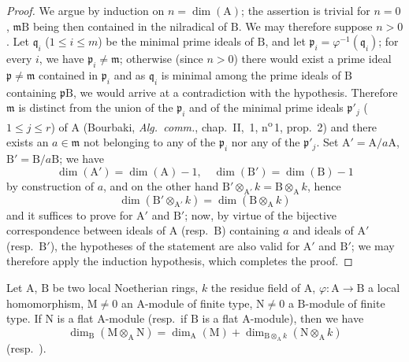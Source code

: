 \begin{proof}
We argue by induction on $n=\dim(\mathrm{A})$; the assertion is trivial for $n=0$, $\mathfrak{m}\mathrm{B}$ being then contained in the nilradical of $\mathrm{B}$.
We may therefore suppose $n>0$.
Let $\mathfrak{q}_i$ ($1\leqslant i\leqslant m$) be the minimal prime ideals of $\mathrm{B}$, and let $\mathfrak{p}_i=\varphi^{-1}(\mathfrak{q}_i)$; for every $i$, we have $\mathfrak{p}_i\neq\mathfrak{m}$; otherwise (since $n>0$) there would exist a prime ideal $\mathfrak{p}\neq\mathfrak{m}$ contained in $\mathfrak{p}_i$ and as $\mathfrak{q}_i$ is minimal among the prime ideals of $\mathrm{B}$ containing $\mathfrak{p}\mathrm{B}$, we would arrive at a contradiction with the hypothesis.
Therefore $\mathfrak{m}$ is distinct from the union of the $\mathfrak{p}_i$ and of the minimal prime ideals $\mathfrak{p}'_j$ ($1\leqslant j\leqslant r$) of $\mathrm{A}$ (Bourbaki, \emph{Alg.\ comm.}, chap.~II, \textsection\,1, n\textsuperscript{o}\,1, prop.~2) and there exists an $a\in\mathfrak{m}$ not belonging to any of the $\mathfrak{p}_i$ nor any of the $\mathfrak{p}'_j$.
Set $\mathrm{A}'=\mathrm{A}/a\mathrm{A}$, $\mathrm{B}'=\mathrm{B}/a\mathrm{B}$; we have 
\[
  \dim(\mathrm{A}')=\dim(\mathrm{A})-1,\quad
  \dim(\mathrm{B}')=\dim(\mathrm{B})-1
\]
by construction of $a$, and on the other hand $\mathrm{B}'\otimes_{\mathrm{A}'}k=\mathrm{B}\otimes_\mathrm{A} k$, hence
\[
  \dim(\mathrm{B}'\otimes_{\mathrm{A}'}k)=\dim(\mathrm{B}\otimes_\mathrm{A} k)
\]
and it suffices to prove  for $\mathrm{A}'$ and $\mathrm{B}'$; now, by virtue of the bijective correspondence between ideals of $\mathrm{A}$ (resp.\ $\mathrm{B}$) containing $a$ and ideals of $\mathrm{A}'$ (resp.\ $\mathrm{B}'$), the hypotheses of the statement are also valid for $\mathrm{A}'$ and $\mathrm{B}'$; we may therefore apply the induction hypothesis, which completes the proof.
\end{proof}

\begin{corollary}[6.1.2]
\label{IV.6.1.2}
Let $\mathrm{A}$, $\mathrm{B}$ be two local Noetherian rings, $k$ the residue field of $\mathrm{A}$, $\varphi:\mathrm{A}\to\mathrm{B}$ a local homomorphism, $\mathrm{M}\neq 0$ an $\mathrm{A}$-module of finite type, $\mathrm{N}\neq 0$ a $\mathrm{B}$-module of finite type.
If $\mathrm{N}$ is a flat $\mathrm{A}$-module \textnormal{(}resp.\ if $\mathrm{B}$ is a flat $\mathrm{A}$-module\textnormal{)}, then we have
\begin{equation}
  \dim_\mathrm{B}(\mathrm{M}\otimes_\mathrm{A}\mathrm{N})=\dim_\mathrm{A}(\mathrm{M})+\dim_{\mathrm{B}\otimes_\mathrm{A} k}(\mathrm{N}\otimes_\mathrm{A} k)
  \tag{6.1.2.1}
\end{equation}
\textnormal{(}resp.\ \textnormal{)}.
\end{corollary}

